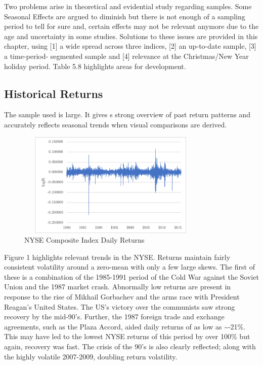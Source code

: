 \documentclass[11pt, english]{article}
\begin{document}
	Two problems arise in theoretical and evidential study regarding samples. Some Seasonal Effects are argued to diminish but there is not enough of a sampling period to tell for sure and, certain effects may not be relevant anymore due to the age and uncertainty in some studies. Solutions to these issues are provided in this chapter, using [1] a wide spread across three indices, [2] an up-to-date sample, [3] a time-period- segmented sample and [4] relevance at the Christmas/New Year holiday period. Table 5.8 highlights areas for development.

	\newpage

	\subsection{Historical Returns}

	The sample used is large. It gives s strong overview of past return patterns and accurately reflects seasonal trends when visual comparisons are derived.\\

	\begin{figure}[H]
	\begin{center}
		\includegraphics[width=9cm,height=5cm]{NYSE-Returns.png}
		\caption{NYSE Composite Index Daily Returns}
	\end{center}
	\end{figure}

	Figure 1 highlights relevant trends in the NYSE. Returns maintain fairly consistent volatility around a zero-mean with only a few large skews. The first of these is a combination of the 1985-1991 period of the Cold War against the Soviet Union and the 1987 market crash. Abnormally low returns are present in response to the rise of Mikhail Gorbachev and the arms race with President Reagan’s United States. The US’s victory over the communists saw strong recovery by the mid-90’s. Further, the 1987 foreign trade and exchange agreements, such as the Plaza Accord, aided daily returns of as low as \~{}-21\%. This may have led to the lowest NYSE returns of this period by over 100\% but again, recovery was fast. The crisis of the 90’s is also clearly reflected; along with the highly volatile 2007-2009, doubling return volatility.\\
\end{document}
